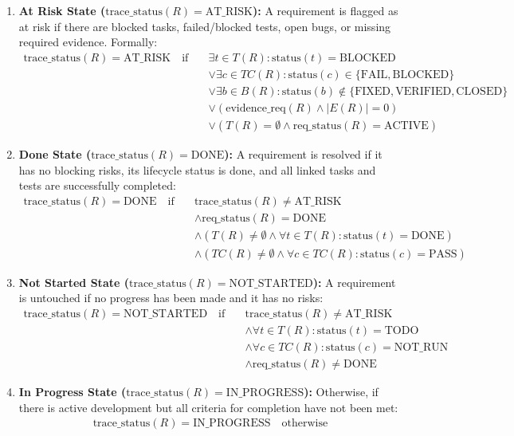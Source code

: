 \begin{enumerate}
    \item \textbf{At Risk State ($\text{trace\_status}(R) = \text{AT\_RISK}$):} A requirement is flagged as at risk if there are blocked tasks, failed/blocked tests, open bugs, or missing required evidence. Formally:
    \begin{align*}
    \text{trace\_status}(R) = \text{AT\_RISK} \quad \text{if} \quad 
    & \exists t \in T(R): \text{status}(t) = \text{BLOCKED} \\
    & \lor \exists c \in TC(R): \text{status}(c) \in \{\text{FAIL}, \text{BLOCKED}\} \\
    & \lor \exists b \in B(R): \text{status}(b) \notin \{\text{FIXED}, \text{VERIFIED}, \text{CLOSED}\} \\
    & \lor (\text{evidence\_req}(R) \land |E(R)| = 0) \\
    & \lor (T(R) = \emptyset \land \text{req\_status}(R) = \text{ACTIVE})
    \end{align*}
    
    \item \textbf{Done State ($\text{trace\_status}(R) = \text{DONE}$):} A requirement is resolved if it has no blocking risks, its lifecycle status is done, and all linked tasks and tests are successfully completed:
    \begin{align*}
    \text{trace\_status}(R) = \text{DONE} \quad \text{if} \quad 
    & \text{trace\_status}(R) \neq \text{AT\_RISK} \\
    & \land \text{req\_status}(R) = \text{DONE} \\
    & \land (T(R) \neq \emptyset \land \forall t \in T(R): \text{status}(t) = \text{DONE}) \\
    & \land (TC(R) \neq \emptyset \land \forall c \in TC(R): \text{status}(c) = \text{PASS})
    \end{align*}

    \item \textbf{Not Started State ($\text{trace\_status}(R) = \text{NOT\_STARTED}$):} A requirement is untouched if no progress has been made and it has no risks:
    \begin{align*}
    \text{trace\_status}(R) = \text{NOT\_STARTED} \quad \text{if} \quad
    & \text{trace\_status}(R) \neq \text{AT\_RISK} \\
    & \land \forall t \in T(R): \text{status}(t) = \text{TODO} \\
    & \land \forall c \in TC(R): \text{status}(c) = \text{NOT\_RUN} \\
    & \land \text{req\_status}(R) \neq \text{DONE}
    \end{align*}

    \item \textbf{In Progress State ($\text{trace\_status}(R) = \text{IN\_PROGRESS}$):} Otherwise, if there is active development but all criteria for completion have not been met:
    \begin{align*}
    \text{trace\_status}(R) = \text{IN\_PROGRESS} \quad \text{otherwise}
    \end{align*}
\end{enumerate}

